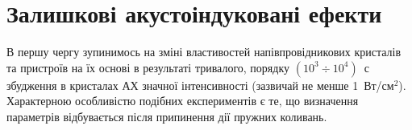
\section{Залишкові акустоіндуковані ефекти}

В першу чергу зупинимось на зміні властивостей напівпровідникових кристалів та пристроїв на їх основі в результаті тривалого, порядку $(10^3\div10^4)$~с збудження в кристалах АХ значної інтенсивності (зазвичай не менше 1~Вт/см$^2$).
Характерною особливістю подібних експериментів є те, що визначення параметрів відбувається після припинення дії пружних коливань.

